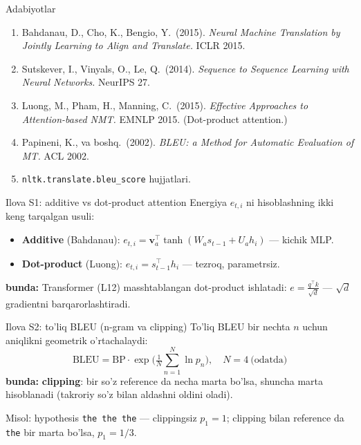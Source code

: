 \documentclass[aspectratio=169,11pt]{beamer}
\newcommand{\bunda}[1]{{\small\textbf{bunda:}\; #1}}
\begin{document}
\begin{frame}{Adabiyotlar}
  \begin{enumerate}\small\setlength\itemsep{5pt}
    \item Bahdanau, D., Cho, K., Bengio, Y.\ (2015). \textit{Neural Machine Translation
          by Jointly Learning to Align and Translate.} ICLR 2015.
    \item Sutskever, I., Vinyals, O., Le, Q.\ (2014). \textit{Sequence to Sequence
          Learning with Neural Networks.} NeurIPS 27.
    \item Luong, M., Pham, H., Manning, C.\ (2015). \textit{Effective Approaches to
          Attention-based NMT.} EMNLP 2015. (Dot-product attention.)
    \item Papineni, K., va boshq.\ (2002). \textit{BLEU: a Method for Automatic
          Evaluation of MT.} ACL 2002.
    \item \texttt{nltk.translate.bleu\_score} hujjatlari.
  \end{enumerate}
\end{frame}

\appendix

\begin{frame}{Ilova S1: additive vs dot-product attention}
  \small
  Energiya $e_{t,i}$ ni hisoblashning ikki keng tarqalgan usuli:
  \begin{itemize}\setlength\itemsep{2pt}
    \item \textbf{Additive} (Bahdanau): $e_{t,i}=\mathbf{v}_a^\top\tanh(W_a s_{t-1}+U_a h_i)$
          --- kichik MLP.
    \item \textbf{Dot-product} (Luong): $e_{t,i}=s_{t-1}^\top h_i$ --- tezroq,
          parametrsiz.
  \end{itemize}
  \bunda{Transformer (L12) masshtablangan dot-product ishlatadi:
  $e=\tfrac{q^\top k}{\sqrt{d}}$ --- $\sqrt{d}$ gradientni barqarorlashtiradi.}
\end{frame}

\begin{frame}{Ilova S2: to'liq BLEU (n-gram va clipping)}
  \small
  To'liq BLEU bir nechta $n$ uchun aniqlikni geometrik o'rtachalaydi:
  $$ \mathrm{BLEU} = \mathrm{BP}\cdot\exp\!\Big(\tfrac{1}{N}\sum_{n=1}^{N}\ln p_n\Big),
     \quad N=4 \ \text{(odatda)} $$
  \bunda{\textbf{clipping}: bir so'z reference da necha marta bo'lsa, shuncha marta
  hisoblanadi (takroriy so'z bilan aldashni oldini oladi).}
  \vspace{4pt}

  Misol: hypothesis \texttt{the the the} --- clippingsiz $p_1{=}1$; clipping bilan
  reference da \texttt{the} bir marta bo'lsa, $p_1{=}1/3$.
\end{frame}
\end{document}
